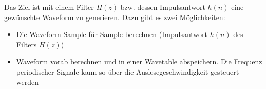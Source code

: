 % 
% 
% 
% 
%

Das Ziel ist mit einem Filter $H(z)$ bzw. dessen Impulsantwort $h(n)$ eine gewünschte Waveform zu generieren. Dazu gibt es zwei Möglichkeiten:
\begin{itemize}
 \item Die Waveform Sample für Sample berechnen (Impulsantwort $h(n)$ des Filters $H(z)$)
 \item Waveform vorab berechnen und in einer Wavetable abspeichern. Die Frequenz periodischer Signale kann so über die Auslesegeschwindigkeit gesteuert werden
\end{itemize}


